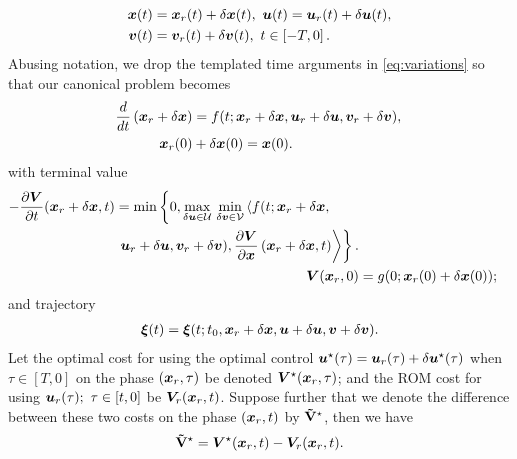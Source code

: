 %
\begin{subequations}
	\begin{align}
		\bm{x}(t) &= \bm{x}_r(t) + \delta\bm{x}(t), \,\, 	\bm{u}(t) = \bm{u}_r(t) + \delta\bm{u}(t), \\
		\bm{v}(t) &= \bm{v}_r(t) + \delta\bm{v}(t), \,\, t \in \left[-T, 0\right].
	\end{align}
	\label{eq:variations}
\end{subequations}
%
Abusing notation, we drop the templated time arguments in \eqref{eq:variations} so that our canonical problem becomes 
%
	\begin{align}
		\dfrac{d}{dt}\left(\bm{x}_r + \delta \bm{x}\right) &= f(t; \bm{x}_r + \delta \bm{x}, \bm{u}_r + \delta \bm{u}, \bm{v}_r + \delta \bm{v}), \,  \\
	 \bm{x}_r(0) 	&+ \delta \bm{x}(0) = \bm{x}(0).
	\end{align}
%
with terminal value 
%
\begin{align}
	\begin{split}
		-\frac{\partial \valuefunc}{\partial t}(\state_r + \delta \state, t)
		&= 
		\min \left\{0,  
		\max_{\delta \control \in \mathcal{U}} \, \min_{\delta \disturb \in \mathcal{V}} \left\langle f(t; \state_r + \delta \state, \right. \right. \\
		&  \left. \left.  \control_r + \delta \control, \disturb_r + \delta \disturb), \dfrac{\partial \valuefunc}{\partial \state}\left(\state_r + \delta \state, t \right) \right\rangle \right\}. 
	\end{split} \nonumber \\
	\valuefunc(\state_r, 0) &= g(0; \state_r(0) + \delta \state (0));
	\label{eq:canonical_value}
\end{align}
%
and trajectory
%
\begin{align}
	\bm{\xi}(t) = \bm{\xi}(t; t_0, \bm{x}_r + \delta\bm{x}, 	\bm{u}+\delta\bm{u},\bm{v}+\delta\bm{v}).
\end{align}
%
%
Let the optimal cost  for using the optimal control $\bm{u}^\star(\tau) = \bm{u}_r(\tau) + \delta \bm{u}^\star(\tau)$ when $\tau \in \left[T, 0\right]$ on the phase $(\bm{x}_r, \tau)$ be denoted $\bm{V}^\star(\bm{x}_r, \tau)$; and the ROM cost for using $\bm{u}_r(\tau); \,\, \tau \in \left[t, 0\right]$ be $\bm{V}_r(\bm{x}_r, t)$. Suppose further that we denote  the difference between these two costs on the phase $\left(\bm{x}_r, t\right)$ by $\mathbf{\tilde{V}}^\star$, then we have
%
\begin{align}
	\costdiff^\star =\valuefunc^\star(\state_r, t) -\valuefunc_r(\state_r, t).
	\label{eq:cost_diff}
\end{align}
%

